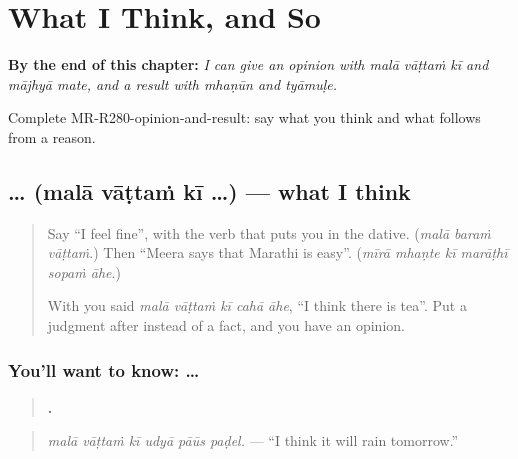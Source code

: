 
\chapter{What I Think, and So}
\label{ch:mr-what-i-think-and-so}

\begin{chapteropening}
\textbf{By the end of this chapter:} \emph{I can give an opinion with malā vāṭtaṁ kī and mājhyā mate, and a result with mhaṇūn and tyāmuḷe.}

Complete MR-R280-opinion-and-result: say what you think and what follows from a reason.
\end{chapteropening}

\section[\texorpdfstring{\mr{मला} \mr{वाटतं} \mr{की} … (malā vāṭtaṁ kī …)}{मला वाटतं की … (malā vāṭtaṁ kī …)}]{   … (malā vāṭtaṁ kī …) — what I think}

\label{lesson:MR-C280-mala-vatte}



\begin{quote}
Say \textquotedblleft{}I feel fine\textquotedblright{}, with the verb that puts you in the dative. (\emph{malā baraṁ vāṭtaṁ}.) Then \textquotedblleft{}Meera says that Marathi is easy\textquotedblright{}. (\emph{mīrā mhaṇte kī marāṭhī sopaṁ āhe}.)

With \textbf{} you said \emph{malā vāṭtaṁ kī cahā āhe}, \textquotedblleft{}I think there is tea\textquotedblright{}. Put a judgment after \textbf{} instead of a fact, and you have an opinion.
\end{quote}

\subsection*{You'll want to know:    …}
\begin{quote}
\textbf{     .}
\end{quote}

\begin{quote}
\emph{malā vāṭtaṁ kī udyā pāūs paḍel.} — \textquotedblleft{}I think it will rain tomorrow.\textquotedblright{}
\end{quote}


